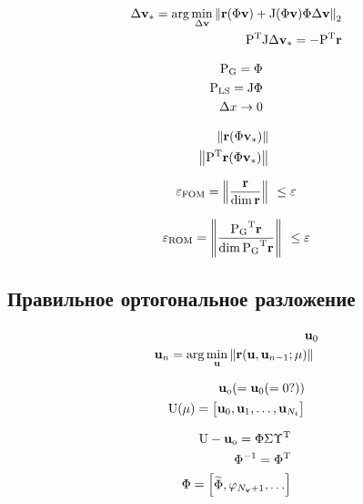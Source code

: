 \begin{align}
    \dvunk_\ast = \arg \min_{\dvunk} \norm[2]{\resid(\Phi \vunk) + \jac(\Phi \vunk) \Phi \dvunk} \\
    \transpose{P}\jac \dvunk_\ast = - \transpose{P} \resid
\end{align}

\begin{align}
    \matr{P}_\text{G} = \Phi \\
    \matr{P}_\text{LS} = \jac \Phi \\
    \Delta x \rightarrow 0
\end{align}

\begin{align}
    \norm{\resid(\Phi \vunk_\ast)} \\
    \norm{\transpose{P}\resid(\Phi \vunk_\ast)}
\end{align}

\begin{equation}
    \varepsilon_\text{FOM} = \left\| \frac{\mathbf{r}}{\dim{\mathbf{r}}} \right\|_{~} \leq \varepsilon \\
\end{equation}

\begin{equation}
    \varepsilon_\text{ROM} = \norm{\frac{\transpose{\matr{P}_\text{G}}\resid}{\dim{ \transpose{\matr{P}_\text{G}}\resid}}} \leq \varepsilon
\end{equation}

\subsection{Правильное ортогональное разложение}

\begin{align}
    \mathbf{u}_0 \\
    \mathbf{u}_n = \arg \min_{\mathbf{u}} \left\| \mathbf{r}(\mathbf{u},\mathbf{u}_{n-1};\mathbf{\mu}) \right\|_{~}
\end{align}

\begin{align}
    \unk_\text{o} (= \unk_0 (= 0 ?)) \\
    \matr{U} (\param) =
    \begin{bmatrix}
        \unk_0, \unk_1, \dots, \unk_{N_t}
    \end{bmatrix}
\end{align}

\begin{align}
    \matr{u} - \unk_\text{o} = \Phi \Sigma \transpose{\Upsilon} \\
    \Phi^{-1} = \transpose{\Phi} \\
    \Phi = \begin{bmatrix}
        \widetilde{\Phi}, \pc[N_\vunk + 1], \dots
    \end{bmatrix}
\end{align}

